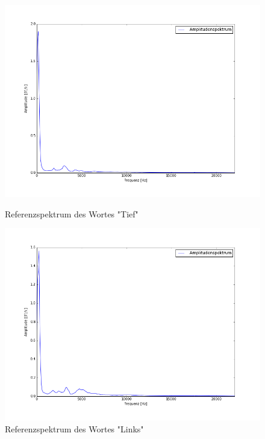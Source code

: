 \documentclass[12pt,oneside,a4paper]{report}
\begin{document}
\begin{figure}[H]
\centering\small
\includegraphics[scale=0.5]{src/ReferenzspektrumTief.png}
\caption{Referenzspektrum des Wortes "Tief"}
\label{fig:REF_TIEF}

\centering\small
\includegraphics[scale=0.5]{src/ReferenzspektrumLinks.png}
\caption{Referenzspektrum des Wortes "Links"}
\label{fig:REF_LINKS}
\end{figure}
\end{document}
